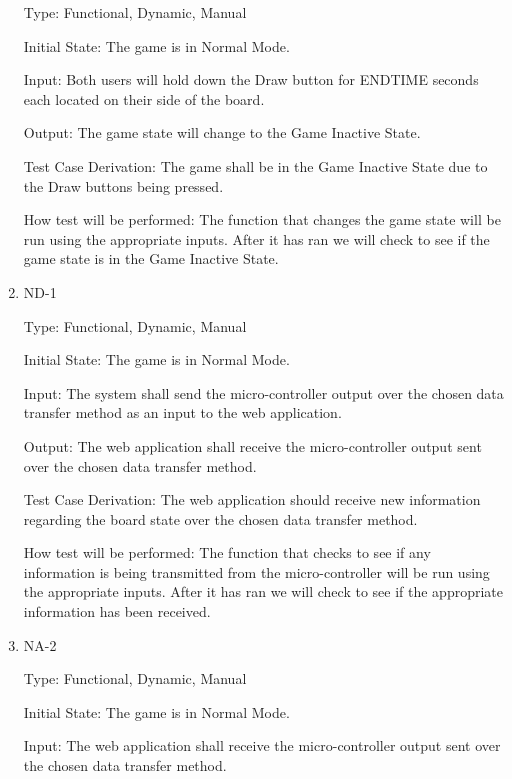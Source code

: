 \documentclass[12pt, titlepage]{article}
\begin{document}
\begin{enumerate}
    Type: Functional, Dynamic, Manual
                      
    Initial State: The game is in Normal Mode.
                        
    Input: Both users will hold down the Draw button for ENDTIME seconds each located on their side of the board.
                        
    Output: The game state will change to the Game Inactive State.
                        
    Test Case Derivation: The game shall be in the Game Inactive State due to the Draw buttons being pressed.
    
    How test will be performed: The function that changes the game state will be run using the appropriate inputs.
    After it has ran we will check to see if the game state is in the Game Inactive State.

    \item{ND-1\\}

    Type: Functional, Dynamic, Manual
                      
    Initial State: The game is in Normal Mode.
                        
    Input: The system shall send the micro-controller output over the chosen data transfer
    method as an input to the web application.
                        
    Output: The web application shall receive the micro-controller output sent over the chosen data transfer
    method.
                        
    Test Case Derivation: The web application should receive new information regarding the board state over the chosen data transfer method. 

    How test will be performed: The function that checks to see if any information is being transmitted from the micro-controller
    will be run using the appropriate inputs. After it has ran we will check to see if the appropriate information has been received.

    \item{NA-2\\}

    Type: Functional, Dynamic, Manual
                      
    Initial State: The game is in Normal Mode.
                        
    Input: The web application shall receive the micro-controller output sent over the chosen data transfer
    method.
                        

\end{enumerate}
\end{document}

